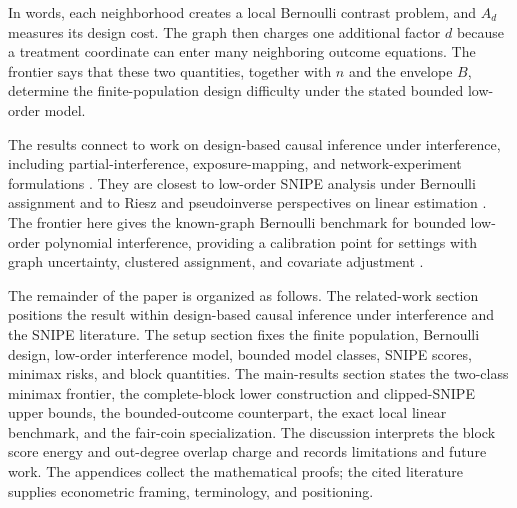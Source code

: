 In words, each neighborhood creates a local Bernoulli contrast problem, and \(A_d\) measures its design cost. The graph then charges one additional factor \(d\) because a treatment coordinate can enter many neighboring outcome equations. The frontier says that these two quantities, together with \(n\) and the envelope \(B\), determine the finite-population design difficulty under the stated bounded low-order model.

The results connect to work on design-based causal inference under interference, including partial-interference, exposure-mapping, and network-experiment formulations \citep{Sobel2006,HudgensHalloran2008,Bowers2013,Ugander2013,Aronow2017,Eckles2017,Ogburn2017}. They are closest to low-order SNIPE analysis under Bernoulli assignment \citep{CortezRodriguezEichhornYu2023} and to Riesz and pseudoinverse perspectives on linear estimation \citep{Swaminathan2017,HarshawSavjeWang2025}. The frontier here gives the known-graph Bernoulli benchmark for bounded low-order polynomial interference, providing a calibration point for settings with graph uncertainty, clustered assignment, and covariate adjustment \citep{YuAiroldiBorgsChayes2022,EichhornKhanUganderYu2026,WangLi2026}.

The remainder of the paper is organized as follows. The related-work section positions the result within design-based causal inference under interference and the SNIPE literature. The setup section fixes the finite population, Bernoulli design, low-order interference model, bounded model classes, SNIPE scores, minimax risks, and block quantities. The main-results section states the two-class minimax frontier, the complete-block lower construction and clipped-SNIPE upper bounds, the bounded-outcome counterpart, the exact local linear benchmark, and the fair-coin specialization. The discussion interprets the block score energy and out-degree overlap charge and records limitations and future work. The appendices collect the mathematical proofs; the cited literature supplies econometric framing, terminology, and positioning.
